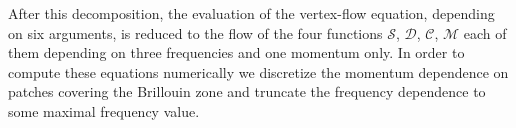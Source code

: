 After this decomposition, the evaluation of the vertex-flow equation, depending on six arguments, is reduced to the flow of the four functions $\mathcal{S}$, $\mathcal{D}$, $\mathcal{C}$, $\mathcal{M}$ 
each of them depending on three frequencies and one momentum only. In order to compute these equations numerically we discretize the momentum 
dependence on patches covering the Brillouin zone and truncate the frequency dependence to some maximal frequency value.

